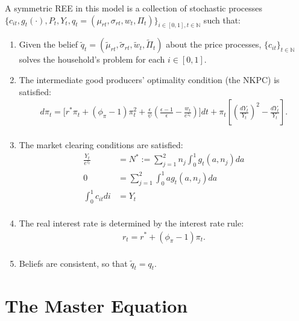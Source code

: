 \documentclass[notitlepage,a4paper,11pt]{report}
\numberwithin{section}{chapter}
\numberwithin{subsection}{section}
\begin{document}
A symmetric REE in this model is a collection of stochastic processes $\{ c_{it}, g_t(\cdot), P_t, Y_t, q_t = (\mu_{rt}, \sigma_{rt}, w_t, \Pi_t) \}_{i \in [0,1], t \in \mathbb{N}}$ such that: 
\begin{enumerate}[label=\arabic*)]
\item Given the belief $\tilde{q}_t = (\tilde{\mu}_{rt}, \tilde{\sigma}_{rt}, \tilde{w}_t, \tilde{\Pi}_t)$ about the price processes, $\{c_{it} \}_{t \in \mathbb{N}}$ solves the household's problem for each $i \in [0,1]$. \\


\item The intermediate good producers' optimality condition (the NKPC) is satisfied: 
\begin{align*}
d \pi_t = \Bigg[ r^* \pi_t + (\phi_{\pi} -1)\pi_t^2 +  \frac{\epsilon}{\psi} \left( \frac{\epsilon-1}{\epsilon} - \frac{w_t}{e^{z_t}} \right) \Bigg] dt + \pi_t \left[ \left( \frac{dY_t}{Y_t} \right)^2 - \frac{dY_t}{Y_t} \right]. \\
\end{align*}



\item The market clearing conditions are satisfied: 
\begin{align*}
 \frac{Y_t}{e^{z_t}} &  = N^* := \sum_{j=1}^2 n_j \int_0^1 g_t(a,n_j) da \tag{Labor Market} \\[10pt]
0 & =\sum_{j=1}^2\int_0^1 a g_t(a,n_j) da \tag{Bond Market} \\[10pt]
\int_0^1 c_{it} di & = Y_t \tag{Goods Market (Redundant)} \\[10pt]
\end{align*}


\item The real interest rate is determined by the interest rate rule: 
\begin{align*}
r_t = r^* + (\phi_{\pi} -1 ) \pi_t. \\
\end{align*}


\item Beliefs are consistent, so that $\tilde{q}_t = q_t$. \\

\end{enumerate}


\pagebreak


\section{The Master Equation}
\end{document}
